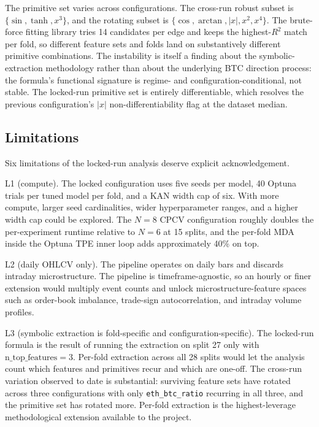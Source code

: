 \documentclass[12pt,a4paper,oneside]{article}
\begin{document}
The primitive set varies across configurations. The cross-run robust subset is $\{\sin, \tanh, x^3\}$, and the rotating subset is $\{\cos, \arctan, \lvert x \rvert, x^2, x^4\}$. The brute-force fitting library tries 14 candidates per edge and keeps the highest-$R^2$ match per fold, so different feature sets and folds land on substantively different primitive combinations. The instability is itself a finding about the symbolic-extraction methodology rather than about the underlying BTC direction process: the formula's functional signature is regime- and configuration-conditional, not stable. The locked-run primitive set is entirely differentiable, which resolves the previous configuration's $\lvert x \rvert$ non-differentiability flag at the dataset median.


\subsection{Limitations}\label{subsec:disc_limitations}

Six limitations of the locked-run analysis deserve explicit acknowledgement.

L1 (compute). The locked configuration uses five seeds per model, 40 Optuna trials per tuned model per fold, and a KAN width cap of six. With more compute, larger seed cardinalities, wider hyperparameter ranges, and a higher width cap could be explored. The $N = 8$ CPCV configuration roughly doubles the per-experiment runtime relative to $N = 6$ at 15 splits, and the per-fold MDA inside the Optuna TPE inner loop adds approximately 40\% on top.

L2 (daily OHLCV only). The pipeline operates on daily bars and discards intraday microstructure. The pipeline is timeframe-agnostic, so an hourly or finer extension would multiply event counts and unlock microstructure-feature spaces such as order-book imbalance, trade-sign autocorrelation, and intraday volume profiles.

L3 (symbolic extraction is fold-specific and configuration-specific). The locked-run formula is the result of running the extraction on split 27 only with $\text{n\_top\_features} = 3$. Per-fold extraction across all 28 splits would let the analysis count which features and primitives recur and which are one-off. The cross-run variation observed to date is substantial: surviving feature sets have rotated across three configurations with only \texttt{eth\_btc\_ratio} recurring in all three, and the primitive set has rotated more. Per-fold extraction is the highest-leverage methodological extension available to the project.
\end{document}
